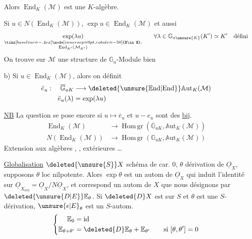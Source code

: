 Alors $\operatorname{End}_K(\mathcal M)$ est une $K$-algèbre.

 Si $u\in N(\operatorname{End}_K(\mathcal M))$, $\exp u\in\operatorname{End}_K(\mathcal M)$ et aussi
\[
\underset{\substack{\tikz[baseline=-.4ex]\node[inner sep=0pt,rotate=-50]{$\in$};\\\operatorname{End}_{K'}(\mathcal M_{K'})}}{\exp(\lambda u)}
\qquad \forall\lambda\in\mathbb G_{a\unsure{K}}(K')\simeq K'\quad\text{défini}
\]
On trouve sur $\mathcal M$ une structure de $\mathbb G_a$-Module bien

b) Si $u\in\operatorname{End}_K(\mathcal M)$, alors on définit
\[
\begin{aligned}
\bar e_u:\quad\overline{\mathbb G}_{aK}&\longrightarrow
\deleted{\unsure{\mathbb E\mathrm{nd}|\mathrm{End}}}\mathbb A\mathrm{ut}_K(\mathcal M)\\
\bar e_u(\lambda)&=\exp(\lambda u)
\end{aligned}
\]

\uline{NB} La question se pose encore si $u\mapsto\bar e_u$ et $u\mathbin{-}e_u$ sont des \uline{bij}.
\[
\begin{aligned}
\operatorname{End}_K(\mathcal M)&\longrightarrow\operatorname{Hom\,gr}(\overline{\mathbb G}_{aK},\mathbb A\mathrm{ut}_K(\mathcal M))\\
N(\operatorname{End}_K(\mathcal M))&\longrightarrow\operatorname{Hom\,gr}(\mathbb G_{aK},\mathbb A\mathrm{ut}_K(\mathcal M))
\end{aligned}
\]
Extension aux  algèbres , , extérieures \ldots



\uline{Globalisation} $\deleted{\unsure{S}}X$ schéma de car. 0, $\theta$  dérivation de $\underline O_X$, supposons $\theta$ loc nilpotente. Alors $\exp\theta$ est un autom de $\underline O_X$ qui induit l'identité sur $\underline O_{X_{\mathrm{réd}}}=\underline O_X/N\underline O_X$, et correspond  un autom de $X$ que nous désignons par $\deleted{\unsure{D|E}}\mathbb E_\theta$. Si $\deleted{D} X$ est sur $S$ et $\theta$ est une $S$-dérivation, $\unsure{\epsilon|E}_\theta$ est un $S$-autom. 
\[
\left\{\begin{aligned}
\mathbb E_0&=\mathrm{id}\\
\mathbb E_{\theta+\theta'}&=\deleted{D}\mathbb E_\theta+\mathbb E_{\theta'}\qquad\text{si }[\theta,\theta']=0
\end{aligned}\right.
\]
